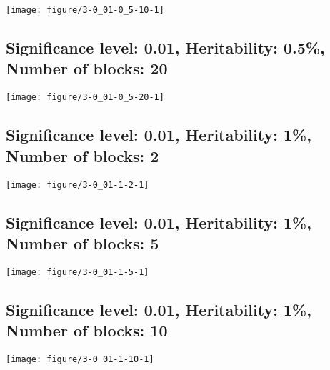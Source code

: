 \documentclass[11pt,letter]{article}\usepackage[]{graphicx}\usepackage[]{color}
\makeatletter
\def\maxwidth{ %
  \ifdim\Gin@nat@width>\linewidth
    \linewidth
  \else
    \Gin@nat@width
  \fi
}
\newenvironment{knitrout}{}{} %
\makeatother
\begin{document}
\begin{knitrout}
\color{fgcolor}
\texttt{[image: figure/3-0\_01-0\_5-10-1]} 

\end{knitrout}

\newpage
\subsection{Significance level: 0.01, Heritability: 0.5\%, Number of blocks: 20}

\begin{knitrout}
\color{fgcolor}
\texttt{[image: figure/3-0\_01-0\_5-20-1]} 

\end{knitrout}

\newpage
\subsection{Significance level: 0.01, Heritability: 1\%, Number of blocks: 2}

\begin{knitrout}
\color{fgcolor}
\texttt{[image: figure/3-0\_01-1-2-1]} 

\end{knitrout}

\newpage
\subsection{Significance level: 0.01, Heritability: 1\%, Number of blocks: 5}

\begin{knitrout}
\color{fgcolor}
\texttt{[image: figure/3-0\_01-1-5-1]} 

\end{knitrout}

\newpage
\subsection{Significance level: 0.01, Heritability: 1\%, Number of blocks: 10}

\begin{knitrout}
\color{fgcolor}
\texttt{[image: figure/3-0\_01-1-10-1]} 

\end{knitrout}
\end{document}
